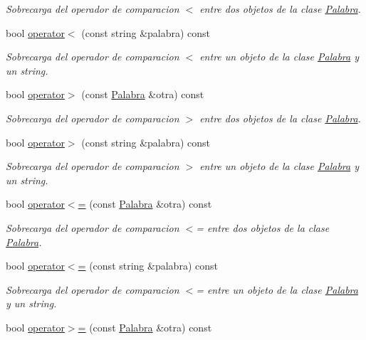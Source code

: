 \begin{DoxyCompactItemize}
\begin{DoxyCompactList}\small\item\em \-Sobrecarga del operador de comparacion $<$ entre dos objetos de la clase \hyperlink{classPalabra}{\-Palabra}. \end{DoxyCompactList}\item 
bool \hyperlink{classPalabra_a58bd91239b931a6f6f94916b3b6de392}{operator$<$} (const string \&palabra) const 
\begin{DoxyCompactList}\small\item\em \-Sobrecarga del operador de comparacion $<$ entre un objeto de la clase \hyperlink{classPalabra}{\-Palabra} y un string. \end{DoxyCompactList}\item 
\hypertarget{classPalabra_abc395ca93a98e2f20e2236f7b6368624}{bool \hyperlink{classPalabra_abc395ca93a98e2f20e2236f7b6368624}{operator$>$} (const \hyperlink{classPalabra}{\-Palabra} \&otra) const }\label{classPalabra_abc395ca93a98e2f20e2236f7b6368624}

\begin{DoxyCompactList}\small\item\em \-Sobrecarga del operador de comparacion $>$ entre dos objetos de la clase \hyperlink{classPalabra}{\-Palabra}. \end{DoxyCompactList}\item 
bool \hyperlink{classPalabra_ac915415bce3d52ca3a6c5cfb9ec4cb7a}{operator$>$} (const string \&palabra) const 
\begin{DoxyCompactList}\small\item\em \-Sobrecarga del operador de comparacion $>$ entre un objeto de la clase \hyperlink{classPalabra}{\-Palabra} y un string. \end{DoxyCompactList}\item 
\hypertarget{classPalabra_a276ff2b10d09f8dae69060444b65787d}{bool \hyperlink{classPalabra_a276ff2b10d09f8dae69060444b65787d}{operator$<$=} (const \hyperlink{classPalabra}{\-Palabra} \&otra) const }\label{classPalabra_a276ff2b10d09f8dae69060444b65787d}

\begin{DoxyCompactList}\small\item\em \-Sobrecarga del operador de comparacion $<$= entre dos objetos de la clase \hyperlink{classPalabra}{\-Palabra}. \end{DoxyCompactList}\item 
bool \hyperlink{classPalabra_ad4e9d5244f075ba01b153c735b87d56d}{operator$<$=} (const string \&palabra) const 
\begin{DoxyCompactList}\small\item\em \-Sobrecarga del operador de comparacion $<$= entre un objeto de la clase \hyperlink{classPalabra}{\-Palabra} y un string. \end{DoxyCompactList}\item 
\hypertarget{classPalabra_a266dcba28d671a970afcab3ce5813f1c}{bool \hyperlink{classPalabra_a266dcba28d671a970afcab3ce5813f1c}{operator$>$=} (const \hyperlink{classPalabra}{\-Palabra} \&otra) const }\label{classPalabra_a266dcba28d671a970afcab3ce5813f1c}


\end{DoxyCompactItemize}
